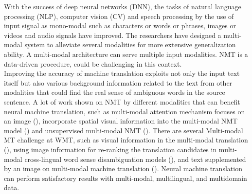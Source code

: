 \documentclass[manuscript,screen]{acmart}
\begin{document}
With the success of deep neural networks (DNN), the tasks of natural language processing (NLP), computer vision (CV) and speech processing by the use of input signal as mono-modal such as characters or words or phrases, images or videos and audio signals have improved. The researchers have designed a multi-modal system to alleviate several modalities for more extensive generalization ability. A multi-modal architecture can serve multiple input modalities. NMT is a data-driven procedure, could be challenging in this context.\\
Improving the accuracy of machine translation exploits not only the input text itself but also various background information related to the text from other modalities that could find the real sense of ambiguous words in the source sentence. A lot of work shown on NMT by different modalities that can benefit neural machine translation, such as multi-modal attention mechanism focuses on an image (\citet{caglayan2016multimodal, heo2019multimodal}), incorporate spatial visual information into the multi-modal NMT model (\citet{calixto2017doubly,huang2016attention, zhou2018visual}) and unsupervised multi-modal NMT (\citet{huang2020unsupervised}). There are several Multi-modal MT challenge at WMT, such as visual information in the multi-modal translation  (\citet{parida2019idiap}), using image information for re-ranking the translation candidates in multi-modal cross-lingual word sense disambiguation models (\citet{ lala2018sheffield}), and text supplemented by an image on multi-modal machine translation (\citet{barrault2018findings, elliott2017findings, specia2016shared}). Neural machine translation can perform satisfactory results with multi-modal, multilingual, and multidomain data.\\
\end{document}
